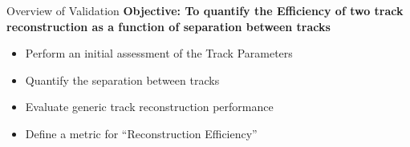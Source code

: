 \begin{frame}{Overview of Validation }
    \textbf{Objective: To quantify the Efficiency of  two track reconstruction  as a function of separation between tracks}
    \begin{itemize}
        \item Perform an initial assessment of the Track Parameters
        \item Quantify the separation between tracks
        \item Evaluate generic track reconstruction performance
        \item Define a metric for ``Reconstruction Efficiency'' 

        
    \end{itemize}

\end{frame}